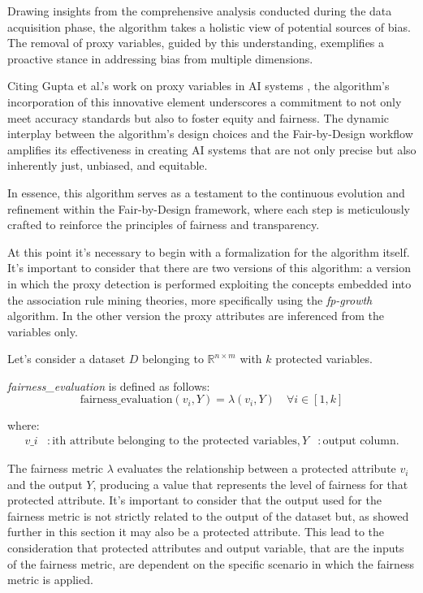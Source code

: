 \documentclass[12pt,a4paper,openright,twoside]{book}
\begin{document}
Drawing insights from the comprehensive analysis conducted during the data acquisition phase, the algorithm takes a holistic view of potential sources of bias. The removal of proxy variables, guided by this understanding, exemplifies a proactive stance in addressing bias from multiple dimensions.

Citing Gupta et al.'s work on proxy variables in AI systems \cite{Gupta2018ProxyF}, the algorithm's incorporation of this innovative element underscores a commitment to not only meet accuracy standards but also to foster equity and fairness. The dynamic interplay between the algorithm's design choices and the Fair-by-Design workflow amplifies its effectiveness in creating AI systems that are not only precise but also inherently just, unbiased, and equitable.

In essence, this algorithm serves as a testament to the continuous evolution and refinement within the Fair-by-Design framework, where each step is meticulously crafted to reinforce the principles of fairness and transparency.

At this point it's necessary to begin with a formalization for the algorithm itself. It's important to consider that there are two versions of this algorithm: a version in which the proxy detection is performed exploiting the concepts embedded into the association rule mining theories, more specifically using the \emph{fp-growth} algorithm. In the other version the proxy attributes are inferenced from the variables only.

Let's consider a dataset \( D \) belonging to \( \mathbb{R}^{n \times m} \) with \( k \) protected variables.

\textit{fairness\_evaluation} is defined as follows:
\[
\text{fairness\_evaluation}(v_i, Y) = \lambda(v_i, Y) \quad \forall i \in [1, k]
\]

where:
\begin{align*}
v\_i & : \text{ith attribute belonging to the protected variables}, Y & : \text{output column}.
\end{align*}

The fairness metric \( \lambda \) evaluates the relationship between a protected attribute \( v_i \) and the output \( Y \), producing a value that represents the level of fairness for that protected attribute. It's important to consider that the output used for the fairness metric is not strictly related to the output of the dataset but, as showed further in this section it may also be a protected attribute. This lead to the consideration that protected attributes and output variable, that are the inputs of the fairness metric, are dependent on the specific scenario in which the fairness metric is applied.
\end{document}
